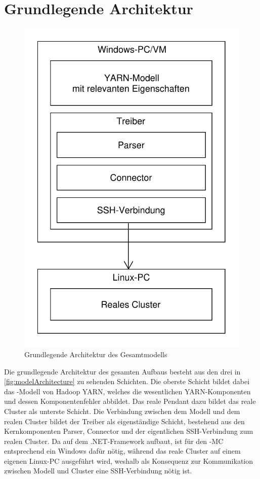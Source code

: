 \section{Grundlegende Architektur}\label{sec:architecture}


\begin{figure}
	\begin{center}
		\includegraphics[width=0.4\columnwidth]{./images/modelArchitecture.pdf}
	\end{center}
	\caption{Grundlegende Architektur des Gesamtmodells}
	\label{fig:modelArchitecture}
\end{figure}

Die grundlegende Architektur des gesamten Aufbaus besteht aus den drei in \autoref{fig:modelArchitecture} zu sehenden Schichten. Die oberste Schicht bildet dabei das \sS-Modell von Hadoop YARN, welches die wesentlichen YARN-Komponenten und dessen Komponentenfehler abbildet. Das reale Pendant dazu bildet das reale Cluster als unterste Schicht. Die Verbindung zwischen dem Modell und dem realen Cluster bildet der Treiber als eigenständige Schicht, bestehend aus den Kernkomponenten Parser, Connector und der eigentlichen SSH-Verbindung zum realen Cluster. Da \sS auf dem .NET-Framework aufbaut, ist für den \sS-MC entsprechend ein Windows dafür nötig, während das reale Cluster auf einem eigenen Linux-PC ausgeführt wird, weshalb als Konsequenz zur Kommunikation zwischen Modell und Cluster eine SSH-Verbindung nötig ist.